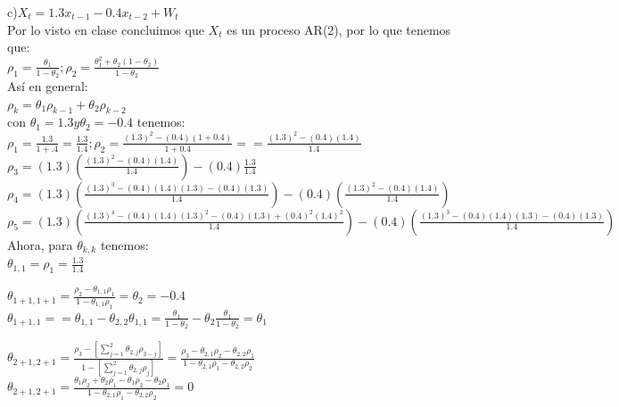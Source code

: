 \documentclass{article}
\begin{document}
c)$X_t = 1.3 x_{t-1} - 0.4 x_{t-2} + W_t$ \\

Por lo visto en clase concluimos que $X_t $ es un proceso AR(2), por lo que tenemos que:\\

$\rho_1 = \frac{\theta_1}{1-\theta_2}    ;   \rho_2 = \frac{\theta_1 ^2 + \theta_2(1-\theta_2)}{1-\theta_2}$\\

Así en general:\\

$\rho_k = \theta_1 \rho_{k-1} + \theta_2 \rho_{k-2} $\\

con $\theta_1 = 1.3  y \theta_2= -0.4 $ tenemos: \\

$\rho_1 = \frac{1.3}{1+.4} = \frac{1.3}{1.4}    ;   \rho_2 = \frac{(1.3) ^2 - (0.4)(1+0.4)}{1+0.4} = = \frac{(1.3) ^2 - (0.4)(1.4)}{1.4}$\\

$\rho_3 = (1.3)(\frac{(1.3) ^2 - (0.4)(1.4)}{1.4}) - (0.4) \frac{1.3}{1.4} $\\

$\rho_4 = (1.3)(\frac{(1.3) ^3 - (0.4)(1.4)(1.3)- (0.4)(1.3)}{1.4}) - (0.4) (\frac{(1.3)^2 -  (0.4)(1.4)}{1.4} )$\\

$\rho_5 = (1.3)(\frac{(1.3) ^4 - (0.4)(1.4)(1.3)^2- (0.4)(1.3)+ (0.4)^2(1.4)^2}{1.4}) - (0.4) (\frac{(1.3)^3 -  (0.4)(1.4)(1.3)-(0.4)(1.3)}{1.4} )$\\

Ahora, para $\theta_{k,k}$ tenemos: \\

$\theta_{1,1} = \rho_1 = \frac{1.3}{1.4}$

$\theta_{1+1,1+1} = \frac{\rho_{2}-\theta_{1,1}\rho_{1} }{1-\theta_{1,1}\rho_{1}} = \theta_2 = -0.4 $\\

$\theta_{1+1,1} = =\theta_{1,1}-\theta_{2,2}\theta_{1,1}= \frac{\theta_1}{1-\theta_2} -\theta_2 \frac{\theta_1}{1-\theta_2} =\theta_1 $

$\theta_{2+1,2+1} = \frac{\rho_{3}-[\sum_{j=1}^{2} \theta_{2,j}\rho_{3-j} ]}{1- [\sum_{j=1}^{2} \theta_{2,j}\rho_{j} ]} = \frac{\rho_{3}-\theta_{2,1}\rho_{2} -\theta_{2,2}\rho_{1}}{1-\theta_{2,1}\rho_{1} -\theta_{2,2}\rho_{2} } $\\

$\theta_{2+1,2+1} = \frac{\theta_1 \rho_2 + \theta_2 \rho_1 - \theta_1 \rho_2 - \theta_2 \rho_1}{1-\theta_{2,1}\rho_{1} -\theta_{2,2}\rho_{2}}  = 0 $\\
\end{document}
